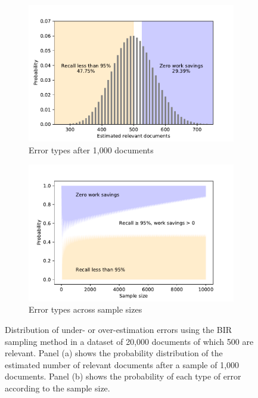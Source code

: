 \documentclass{bmcart}
\begin{document}
	\begin{figure}
		\centering
		\begin{subfigure}[b]{0.475\textwidth}   
			\centering 
			\includegraphics[width=\textwidth]{2_figs_bir_errors.pdf}
			\caption[]%
			{{\small Error types after 1,000 documents \\}}    
			\label{fig:bir_error}
		\end{subfigure}
		\hfill
		\begin{subfigure}[b]{0.475\textwidth}   
			\centering 
			\includegraphics[width=\textwidth]{2_figs_bir_error_distribution.pdf}
			\caption[]%
			{{\footnotesize Error types across sample sizes}}    
			\label{fig:bir_error_distribution}
		\end{subfigure}
		
		\caption{\small Distribution of under- or over-estimation errors using the BIR sampling method in a dataset of 20,000 documents of which 500 are relevant. Panel (a) shows the probability distribution of the estimated number of relevant documents after a sample of 1,000 documents. Panel (b) shows the probability of each type of error according to the sample size.} 
		\label{bir-sampling}
	\end{figure}
	
\end{document}
